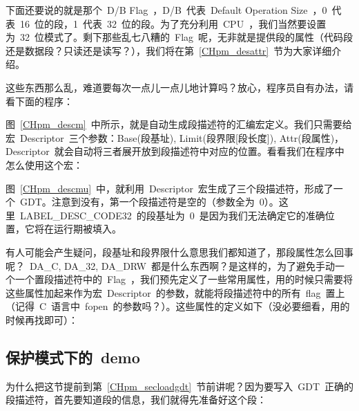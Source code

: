 下面还要说的就是那个~D/B Flag~，D/B~代表~Default Operation Size~，0~代表~16~位的段，1~代表~32~位的段。为了充分利用~CPU~，我们当然要设置为~32~位模式了。剩下那些乱七八糟的~Flag~呢，无非就是提供段的属性（代码段还是数据段？只读还是读写？），我们将在第~\ref{CHpm_desattr}~节为大家详细介绍。

这些东西那么乱，难道要每次一点儿一点儿地计算吗？放心，程序员自有办法，请看下面的程序：

\label{CHpm_descm}

图~\ref{CHpm_descm}~中所示，就是自动生成段描述符的汇编宏定义。我们只需要给宏~Descriptor~三个参数：Base(段基址), Limit(段界限[段长度]), Attr(段属性)，Descriptor~就会自动将三者展开放到段描述符中对应的位置。看看我们在程序中怎么使用这个宏：

\label{CHpm_descmu}

图~\ref{CHpm_descmu}~中，就利用~Descriptor~宏生成了三个段描述符，形成了一个~GDT。注意到没有，第一个段描述符是空的（参数全为~0）。这里~LABEL\_DESC\_CODE32~的段基址为~0~是因为我们无法确定它的准确位置，它将在运行期被填入。

有人可能会产生疑问，段基址和段界限什么意思我们都知道了，那段属性怎么回事呢？~DA\_C, DA\_32, DA\_DRW~都是什么东西啊？是这样的，为了避免手动一个一个置段描述符中的~Flag~，我们预先定义了一些常用属性，用的时候只需要将这些属性加起来作为宏~Descriptor~的参数，就能将段描述符中的所有~flag~置上（记得~C~语言中~fopen~的参数吗？）。这些属性的定义如下（没必要细看，用的时候再找即可）：

\label{CHpm_segattr}

\subsection{保护模式下的~demo}

为什么把这节提前到第~\ref{CHpm_secloadgdt}~节前讲呢？因为要写入~GDT~正确的段描述符，首先要知道段的信息，我们就得先准备好这个段：

